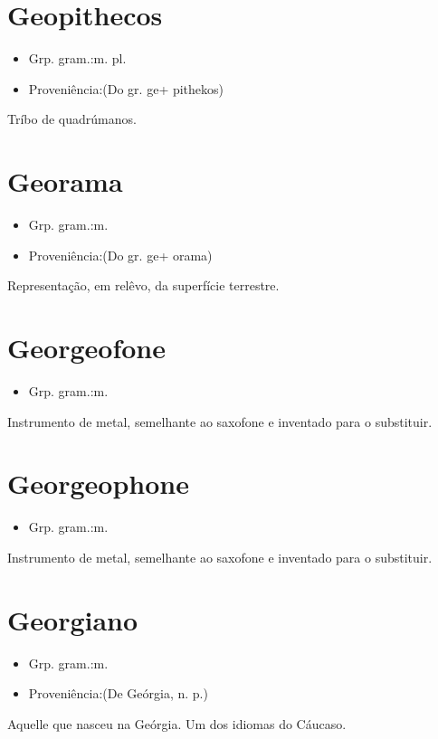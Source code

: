 \section{Geopithecos}
\begin{itemize}
\item {Grp. gram.:m. pl.}
\end{itemize}
\begin{itemize}
\item {Proveniência:(Do gr. \textunderscore ge\textunderscore  + \textunderscore pithekos\textunderscore )}
\end{itemize}
Tríbo de quadrúmanos.
\section{Georama}
\begin{itemize}
\item {Grp. gram.:m.}
\end{itemize}
\begin{itemize}
\item {Proveniência:(Do gr. \textunderscore ge\textunderscore  + \textunderscore orama\textunderscore )}
\end{itemize}
Representação, em relêvo, da superfície terrestre.
\section{Georgeofone}
\begin{itemize}
\item {Grp. gram.:m.}
\end{itemize}
Instrumento de metal, semelhante ao saxofone e inventado para o substituir.
\section{Georgeophone}
\begin{itemize}
\item {Grp. gram.:m.}
\end{itemize}
Instrumento de metal, semelhante ao saxofone e inventado para o substituir.
\section{Georgiano}
\begin{itemize}
\item {Grp. gram.:m.}
\end{itemize}
\begin{itemize}
\item {Proveniência:(De \textunderscore Geórgia\textunderscore , n. p.)}
\end{itemize}
Aquelle que nasceu na Geórgia.
Um dos idiomas do Cáucaso.
